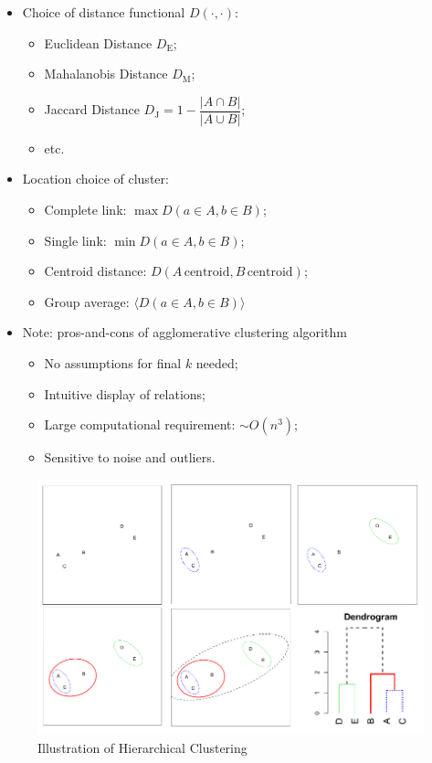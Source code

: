 \begin{itemize}[topsep=2pt,itemsep=0pt]
    \item Choice of distance functional $ D(\cdot,\cdot) $:
\begin{itemize}[topsep=2pt,itemsep=2pt]
    \item Euclidean Distance $ D_\mathrm{E} $;
    \item Mahalanobis Distance $ D_\mathrm{M} $;
    \item Jaccard Distance $ D_\mathrm{J}=1-\dfrac{|A\cap B|}{|A\cup B|} $;
    \item etc.
\end{itemize}
    \item Location choice of cluster:    

    \begin{itemize}[topsep=2pt,itemsep=2pt]
        \item Complete link: $ \max D(a\in A,b\in B) $;
        \item Single link: $ \min D(a\in A,b\in B) $;
        \item Centroid distance: $ D(A\,\mathrm{centroid},B\,\mathrm{centroid}) $;
        \item Group average: $ \langle D(a\in A,b\in B)\rangle $
    \end{itemize}
    \item Note: pros-and-cons of agglomerative clustering algorithm
    \begin{itemize}[topsep=2pt,itemsep=2pt]
        \item No assumptions for final $ k $ needed;
        \item Intuitive display of relations;
        \item Large computational requirement: $ \sim O(n^3) $;
        \item Sensitive to noise and outliers.
    \end{itemize}
\end{itemize}

\begin{figure}[H]
    \centering
    \includegraphics[width=0.7\linewidth]{sections/images/Hierarchical Clustering.png}
    \caption{Illustration of Hierarchical Clustering}
    \label{}
\end{figure}


